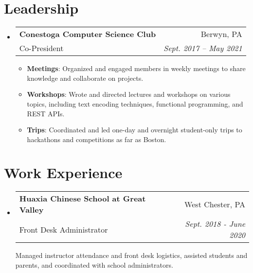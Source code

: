 \documentclass[letterpaper,11pt]{article}
\makeatletter
\newcommand{\resumeSubheading}[4]{
  \vspace{-1pt}\item
    \begin{tabular*}{0.97\textwidth}[t]{l@{\extracolsep{\fill}}r}
      \textbf{#1} & #2 \\
      {\small#3} & \textit{\small #4} \\[3pt]
    \end{tabular*}\vspace{-5pt}
}
\newenvironment{resumeSubHeadingList}{\begin{itemize}[leftmargin=*, label={}]}{\end{itemize}}
\newenvironment{resumeItemList}{\vspace{-2pt}\begin{itemize}}{\end{itemize}\vspace{-5pt}}
\newcommand{\resumeItem}[2]{\item\small{\textbf{#1}{: #2 \vspace{-2pt}}}}
\makeatother
\begin{document}
\section{Leadership}
  \begin{resumeSubHeadingList}

    \resumeSubheading%
      {Conestoga Computer Science Club}{Berwyn, PA}
      {Co-President}{Sept. 2017 -- May 2021}

      \begin{resumeItemList}
        \resumeItem{Meetings}
          {Organized and engaged members in weekly meetings to share knowledge and collaborate on
            projects.}
        \resumeItem{Workshops}
          {Wrote and directed lectures and workshops on various topics, including text encoding
            techniques, functional programming, and REST APIs.}
        \resumeItem{Trips}
          {Coordinated and led one-day and overnight student-only trips to hackathons and
            competitions as far as Boston.}
      \end{resumeItemList}

  \end{resumeSubHeadingList}


\section{Work Experience}
  \begin{resumeSubHeadingList}

    \resumeSubheading%
      {Huaxia Chinese School at Great Valley}{West Chester, PA}
      {Front Desk Administrator}{Sept. 2018 - June 2020}

      Managed instructor attendance and front desk logistics, assisted students and parents, and
        coordinated with school administrators.

  \end{resumeSubHeadingList}

\end{document}
